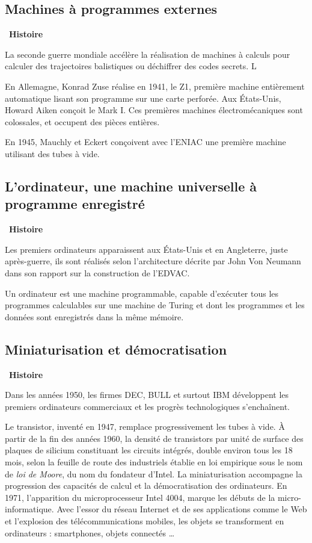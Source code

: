 \documentclass[a4paper, french, 11pt]{article}  %
\newcounter{rque}
\newcounter{prog}
\newcounter{histo}
\newenvironment{histoire}[1]
{\par \medskip   \addtocounter{histo}{1} \noindent  
 \begin {bclogo}[couleur = blue!10 , arrondi =0.1,logo=\bchorloge, marge=4] {~\textbf{Histoire} \textbf{\thehisto} {\itshape #1} }  \par}
{
\end{bclogo}
 \par \bigskip }
\begin{document}
\subsection{Machines à programmes externes} 

\begin{histoire}{}
La seconde guerre mondiale accélère la réalisation de machines à calculs pour calculer des trajectoires balistiques ou déchiffrer des codes secrets. L

En Allemagne, Konrad Zuse réalise en 1941, le Z1, première machine entièrement automatique lisant son programme sur une carte perforée. Aux États-Unis, Howard Aiken conçoit le Mark I. Ces premières machines électromécaniques sont colossales, et occupent des pièces entières. 

En 1945,  Mauchly et Eckert conçoivent avec l'ENIAC une première machine utilisant des tubes à vide.

\end{histoire}

\subsection{L'ordinateur, une machine universelle à programme enregistré}

\begin{histoire}{}
Les premiers ordinateurs apparaissent aux États-Unis et en Angleterre, juste après-guerre, ils sont réalisés selon l'architecture décrite par John Von Neumann dans son rapport sur la construction de l'EDVAC.

Un ordinateur est une machine programmable, capable d'exécuter tous les programmes calculables sur une machine de Turing et dont les programmes et les données sont enregistrés dans la même mémoire.



\end{histoire}

\subsection{Miniaturisation et démocratisation}

\begin{histoire}{}
Dans les années 1950, les firmes DEC, BULL et surtout IBM développent les premiers ordinateurs commerciaux et les progrès technologiques s'enchaînent. 

Le transistor, inventé en 1947, remplace progressivement les tubes à vide. À partir de la fin des années 1960, la densité de transistors par unité de surface des plaques de silicium constituant les circuits intégrés, double environ tous les 18 mois, selon la feuille de route des industriels établie en loi empirique sous le nom de \textit{loi de Moore}, du nom du fondateur d'Intel. La miniaturisation accompagne la progression des capacités de calcul et la démocratisation des ordinateurs. En 1971, l'apparition du microprocesseur Intel 4004, marque les débuts de la micro-informatique. Avec l'essor du réseau Internet et de ses applications comme le Web et l'explosion des télécommunications mobiles, les objets se transforment en ordinateurs : smartphones, objets connectés  \ldots 
\end{histoire}
\end{document}
